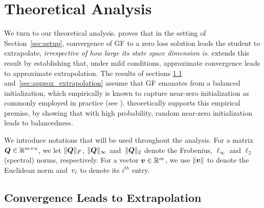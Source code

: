 \section{Theoretical Analysis}\label{sec:analysis}

We turn to our theoretical analysis.
 proves that in the setting of Section~\ref{sec:setup}, convergence of GF to a zero loss solution leads the student to extrapolate, \emph{irrespective of how large its state space dimension is}.
 extends this result by establishing that, under mild conditions, approximate convergence leads to approximate extrapolation.
The results of sections \ref{sec:exact_extrapolation} and~\ref{sec:approx_extrapolation} assume that GF emanates from a balanced initialization, which empirically is known to capture near-zero initialization as commonly employed in practice (see ).
 theoretically supports this empirical premise, by showing that with high probability, random near-zero initialization leads to balancedness.



We introduce notations that will be used throughout the analysis. 
For a matrix ${\bm{Q}}\in\mathbb{R}^{m\times n}$, we let $\|{\bm{Q}}\|_F$, $\|{\bm{Q}}\|_{\infty}$ and~$\|{\bm{Q}}\|_2$ denote the Frobenius, $\ell_{\infty}$ and $\ell_2$ (spectral) norms, respectively.
For a vector ${\bm{v}} \in \mathbb{R}^m$, we use $\|{\bm{v}} \|$ to denote the Euclidean norm and~${v}_i$ to denote its $i^{th}$ entry.

\subsection{Convergence Leads to Extrapolation} \label{sec:exact_extrapolation}

